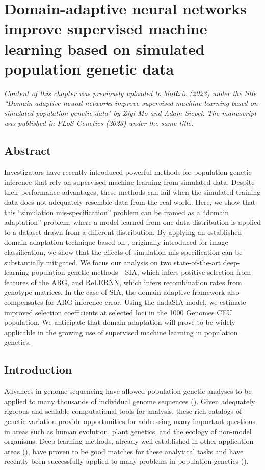 \chapter{Domain-adaptive neural networks improve supervised machine learning based on simulated population genetic data}

\textit{Content of this chapter was previously uploaded to bioRxiv (2023) under the title ``Domain-adaptive neural networks improve supervised machine learning based on simulated population genetic data" by Ziyi Mo and Adam Siepel. The manuscript was published in PLoS Genetics (2023) under the same title.}

\section{Abstract}
Investigators have recently introduced powerful methods for population genetic inference that rely on supervised machine learning from simulated data. Despite their performance advantages, these methods can fail when the simulated training data does not adequately resemble data from the real world. Here, we show that this “simulation mis-specification” problem can be framed as a “domain adaptation” problem, where a model learned from one data distribution is applied to a dataset drawn from a different distribution. By applying an established domain-adaptation technique based on , originally introduced for image classification, we show that the effects of simulation mis-specification can be substantially mitigated. We focus our analysis on two state-of-the-art deep-learning population genetic methods—\ac{SIA}, which infers positive selection from features of the \acf{ARG}, and ReLERNN, which infers recombination rates from genotype matrices. In the case of \ac{SIA}, the domain adaptive framework also compensates for \ac{ARG} inference error. Using the \ac{dadaSIA} model, we estimate improved selection coefficients at selected loci in the 1000 Genomes CEU population. We anticipate that domain adaptation will prove to be widely applicable in the growing use of supervised machine learning in population genetics.

\section{Introduction}
Advances in genome sequencing have allowed population genetic analyses to be applied to many thousands of individual genome sequences (\cite{auton_global_2015,sudlow_uk_2015,karczewski_mutational_2020}). Given adequately rigorous and scalable computational tools for analysis, these rich catalogs of genetic variation provide opportunities for addressing many important questions in areas such as human evolution, plant genetics, and the ecology of non-model organisms. Deep-learning methods, already well-established in other application areas (\cite{lecun_deep_2015}), have proven to be good matches for these analytical tasks and have recently been successfully applied to many problems in population genetics (\cite{sheehan_deep_2016,kern_diploshic_2018,schrider_supervised_2018,flagel_unreasonable_2019,torada_imagene_2019,adrion_predicting_2020,caldas_inference_2022,hejase_deep-learning_2022,korfmann_deep_2023,huang_harnessing_2023}).

